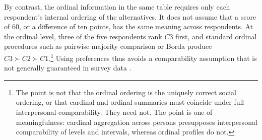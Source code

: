 \documentclass[12pt]{article}
\begin{document}
By contrast, the ordinal information in the same table requires only each respondent's internal ordering of the alternatives. It does not assume that a score of \(60\), or a difference of ten points, has the same meaning across respondents. At the ordinal level, three of the five respondents rank \(C3\) first, and standard ordinal procedures such as pairwise majority comparison or Borda produce \(C3 \succ C2 \succ C1\).\footnote{The point is not that the ordinal ordering is the uniquely correct social ordering, or that cardinal and ordinal summaries must coincide under full interpersonal comparability. They need not. The point is one of meaningfulness: cardinal aggregation across persons presupposes interpersonal comparability of levels and intervals, whereas ordinal profiles do not.} Using preferences thus avoids a comparability assumption that is not generally guaranteed in survey data \parencite{narens2007introduction, narens2020pursuit, sen2018collective}.
\end{document}
